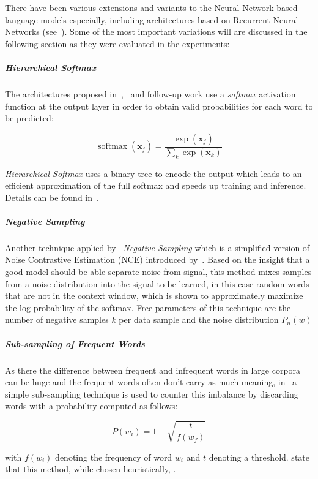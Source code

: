 There have been various extensions and variants to the Neural Network based language models especially, including architectures based on Recurrent Neural Networks (see~\cite{Mikolov:2012aa}). Some of the most important variations will are discussed in the following section as they were evaluated in the experiments:

\subparagraph{Hierarchical Softmax}
The architectures proposed in~\cite{Bengio:2000aa},~\cite{bengio2003neural} and follow-up work use a \emph{softmax} activation function at the output layer in order to obtain valid probabilities for each word to be predicted:

\begin{equation}
  \operatorname{softmax}(\mathbf{x}_j) = \frac{\exp(\mathbf{x}_j)}{\sum_k \exp(\mathbf{x}_k)}
\end{equation}

\emph{Hierarchical Softmax} uses a binary tree to encode the output which leads to an efficient approximation of the full softmax and speeds up training and inference. Details can be found in~\cite{Mikolov:2013ab}.

\subparagraph{Negative Sampling}
Another technique applied by~\cite{Mikolov:2013ab} \emph{Negative Sampling} which is a simplified version of Noise Contrastive Estimation (NCE) introduced by~\cite{Gutmann:2012aa}. Based on the insight that a good model should be able separate noise from signal, this method mixes samples from a noise distribution into the signal to be learned, in this case random words that are not in the context window, which is shown to approximately maximize the log probability of the softmax. Free parameters of this technique are the number of negative samples $k$ per data sample and the noise distribution $P_n(w)$

\subparagraph{Sub-sampling of Frequent Words}
As there the difference between frequent and infrequent words in large corpora can be huge and the frequent words often don't carry as much meaning, in~\cite{Mikolov:2013ab} a simple sub-sampling technique is used to counter this imbalance by discarding words with a probability computed as follows:

\begin{equation}
  P(w_i) = 1 - \sqrt{\frac{t}{f(w_f)}}
\end{equation}

with $f(w_i)$ denoting the frequency of word $w_i$ and $t$ denoting a threshold. \cite{Mikolov:2013ab} state that this method, while chosen heuristically, .

